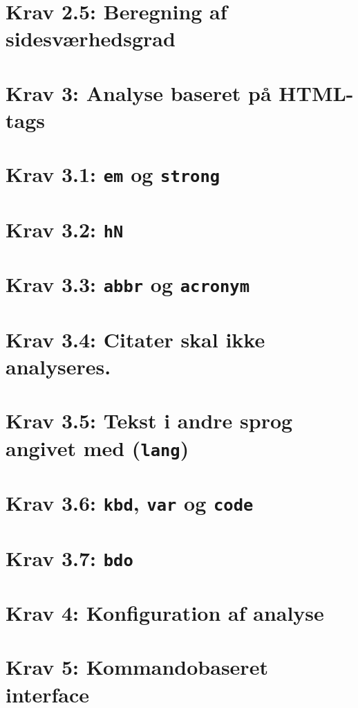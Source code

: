 \documentclass[a4paper,oneside,article, titlepage]{memoir}
\begin{document}
\section*{Krav 2.5: Beregning af sidesværhedsgrad}

\section*{Krav 3: Analyse baseret på HTML-tags}

\section*{Krav 3.1: \texttt{em} og \texttt{strong}}

\section*{Krav 3.2: \texttt{hN}}

\section*{Krav 3.3: \texttt{abbr} og \texttt{acronym}}

\section*{Krav 3.4: Citater skal ikke analyseres.}

\section*{Krav 3.5: Tekst i andre sprog angivet med
  (\texttt{lang})}

\section*{Krav 3.6: \texttt{kbd}, \texttt{var} og \texttt{code}}

\section*{Krav 3.7: \texttt{bdo}}

\section*{Krav 4: Konfiguration af analyse}

\section*{Krav 5: Kommandobaseret interface}
\end{document}
